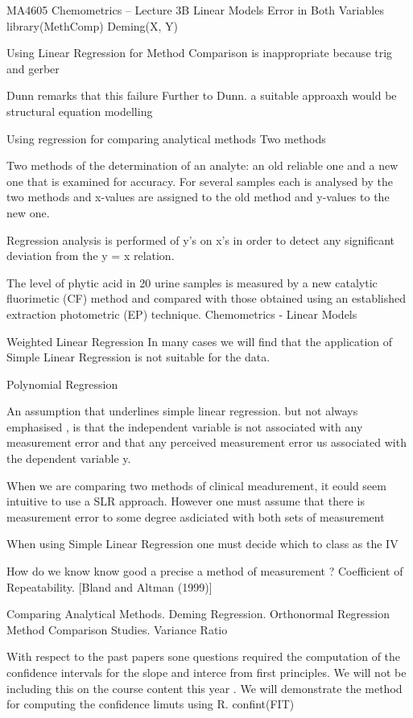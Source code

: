 MA4605 Chemometrics – Lecture 3B Linear Models 
Error in Both Variables
library(MethComp)
Deming(X, Y)

Using Linear Regression for Method Comparison is inappropriate because
trig and gerber


Dunn remarks that this failure
Further to Dunn. a suitable approaxh would be structural equation modelling

Using regression for comparing analytical methods
Two methods

Two methods of the
determination of an analyte:
an old reliable one and a new
one that is examined for
accuracy.
For several samples each is
analysed by the two methods
and x-values are assigned to
the old method and y-values
to the new one.

Regression analysis is
performed of y’s on x’s in
order to detect any significant
deviation from the y = x
relation.

The level of phytic acid in 20
urine samples is measured
by a new catalytic fluorimetic
(CF) method and compared
with those obtained using an
established extraction
photometric (EP) technique.
Chemometrics - Linear Models 




Weighted Linear Regression
In many cases we will find that the application of Simple Linear Regression is not suitable for the data.


Polynomial Regression

An assumption that underlines simple linear regression. but not always emphasised , is that the independent variable is not associated with any measurement error  and that any perceived measurement error us associated with the dependent variable  y.

When we are comparing two methods of clinical meadurement, it eould seem intuitive to use a SLR approach. However one must assume that there is measurement error to some degree asdiciated with both sets of measurement  

When using Simple Linear Regression one must decide which to class as the IV

How do we know know good a precise a method of measurement ? 
Coefficient of Repeatability.
[Bland and Altman (1999)]


Comparing Analytical Methods.
Deming Regression.
Orthonormal Regression
Method Comparison Studies.
Variance Ratio

With respect to the past papers sone questions required the computation of the confidence intervals for the slope and interce from first principles. We will not be including this on the course content this year . We will demonstrate the method for computing the confidence limuts using R.
confint(FIT)

